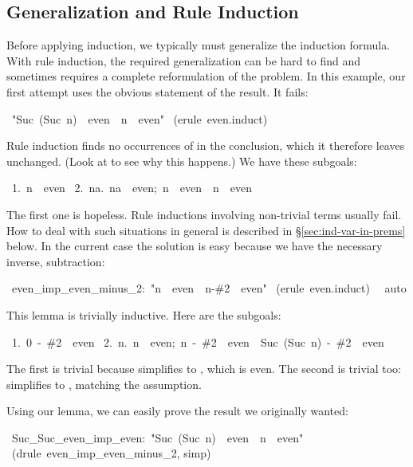 \subsection{Generalization and Rule Induction}
\label{sec:gen-rule-induction}

Before applying induction, we typically must generalize
the induction formula.  With rule induction, the required generalization
can be hard to find and sometimes requires a complete reformulation of the
problem.  In this  example, our first attempt uses the obvious statement of
the result.  It fails:
%
\begin{isabelle}
\ "Suc\ (Suc\ n)\ \isasymin \ even\
\isasymLongrightarrow \ n\ \isasymin \ even"\isanewline
{}\ (erule\ even.induct)\isanewline
{}
\end{isabelle}
%
Rule induction finds no occurrences of  in the
conclusion, which it therefore leaves unchanged.  (Look at
 to see why this happens.)  We have these subgoals:
\begin{isabelle}
\ 1.\ n\ \isasymin \ even\isanewline
\ 2.\ \isasymAnd na.\ \isasymlbrakk na\ \isasymin \ even;\ n\ \isasymin \ even\isasymrbrakk \ \isasymLongrightarrow \ n\ \isasymin \ even%
\end{isabelle}
The first one is hopeless.  Rule inductions involving
non-trivial terms usually fail.  How to deal with such situations
in general is described in {\S}\ref{sec:ind-var-in-prems} below.
In the current case the solution is easy because
we have the necessary inverse, subtraction:
\begin{isabelle}
\ even_imp_even_minus_2:\ "n\ \isasymin \ even\ \isasymLongrightarrow \ n-\#2\ \isasymin \ even"\isanewline
{}\ (erule\ even.induct)\isanewline
\ \isacommand{apply}\ auto\isanewline
{}
\end{isabelle}
%
This lemma is trivially inductive.  Here are the subgoals:
\begin{isabelle}
\ 1.\ 0\ -\ \#2\ \isasymin \ even\isanewline
\ 2.\ \isasymAnd n.\ \isasymlbrakk n\ \isasymin \ even;\ n\ -\ \#2\ \isasymin \ even\isasymrbrakk \ \isasymLongrightarrow \ Suc\ (Suc\ n)\ -\ \#2\ \isasymin \ even%
\end{isabelle}
The first is trivial because  simplifies to , which is
even.  The second is trivial too: \isa{Suc\ (Suc\ n)\ -\ \#2} simplifies to
\isa{n}, matching the assumption.

\medskip
Using our lemma, we can easily prove the result we originally wanted:
\begin{isabelle}
\ Suc_Suc_even_imp_even:\ "Suc\ (Suc\ n)\ \isasymin \ even\ \isasymLongrightarrow \ n\ \isasymin \ even"\isanewline
\isacommand{by}\ (drule\ even_imp_even_minus_2, simp)
\end{isabelle}

